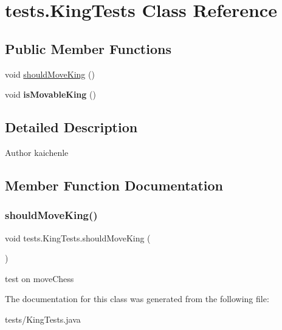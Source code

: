 \hypertarget{classtests_1_1_king_tests}{}\section{tests.\+King\+Tests Class Reference}
\label{classtests_1_1_king_tests}
\subsection*{Public Member Functions}
\begin{DoxyCompactItemize}
\item 
void \mbox{\hyperlink{classtests_1_1_king_tests_a4a13975c203ea411af32909db0364f4c}{should\+Move\+King}} ()
\item 
\mbox{\label{classtests_1_1_king_tests_a0e01efb662d38cd9537a1134b4600bcf}} 
void {\bfseries is\+Movable\+King} ()
\end{DoxyCompactItemize}


\subsection{Detailed Description}
\begin{DoxyAuthor}{Author}
kaichenle 
\end{DoxyAuthor}


\subsection{Member Function Documentation}
\mbox{\label{classtests_1_1_king_tests_a4a13975c203ea411af32909db0364f4c}} 
\subsubsection{\texorpdfstring{should\+Move\+King()}{shouldMoveKing()}}
{\footnotesize\ttfamily void tests.\+King\+Tests.\+should\+Move\+King (\begin{DoxyParamCaption}{ }\end{DoxyParamCaption})\hspace{0.3cm}{\ttfamily [inline]}}

test on move\+Chess 

The documentation for this class was generated from the following file\+:\begin{DoxyCompactItemize}
\item 
tests/King\+Tests.\+java\end{DoxyCompactItemize}
